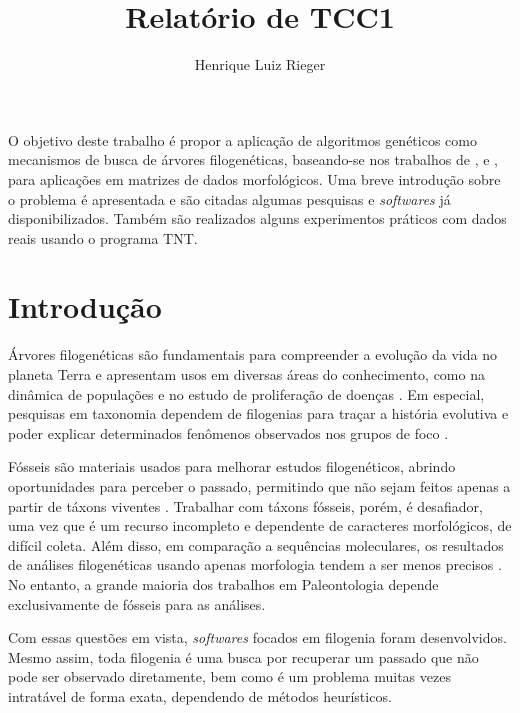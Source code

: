 \documentclass[12pt]{article}
\title{Relatório de TCC1}
\author{Henrique Luiz Rieger\inst{1}}
\begin{document}
 

\maketitle

\begin{resumo}
  O objetivo deste trabalho é propor a aplicação de algoritmos genéticos como mecanismos de busca de árvores filogenéticas, baseando-se nos trabalhos de \cite{parsigal}, \cite{cotta2002inferring} e \cite{garli}, para aplicações em matrizes de dados morfológicos. Uma breve introdução sobre o problema é apresentada e são citadas algumas pesquisas e \emph{softwares} já disponibilizados. Também são realizados alguns experimentos práticos com dados reais usando o programa TNT.
\end{resumo}


\section{Introdução}

Árvores filogenéticas são fundamentais para compreender a evolução da vida no planeta Terra e apresentam usos em diversas áreas do conhecimento, como na dinâmica de populações e no estudo de proliferação de doenças \cite{mo-phynet}. Em especial, pesquisas em taxonomia dependem de filogenias para traçar a história evolutiva e poder explicar determinados fenômenos observados nos grupos de foco \cite{azouri2021harnessing}.

Fósseis são materiais usados para melhorar estudos filogenéticos, abrindo oportunidades para perceber o passado, permitindo que não sejam feitos apenas a partir de táxons viventes \cite{mongiardino2021fossils}. Trabalhar com táxons fósseis, porém, é desafiador, uma vez que é um recurso incompleto e dependente de caracteres morfológicos, de difícil coleta. Além disso, em comparação a sequências moleculares, os resultados de análises filogenéticas usando apenas morfologia tendem a ser menos precisos \cite{berger2010accuracy}. No entanto, a grande maioria dos trabalhos em Paleontologia depende exclusivamente de fósseis para as análises.

Com essas questões em vista, \emph{softwares} focados em filogenia foram desenvolvidos. Mesmo assim, toda filogenia é uma busca por recuperar um passado que não pode ser observado diretamente, bem como é um problema muitas vezes intratável de forma exata, dependendo de métodos heurísticos.
\end{document}
